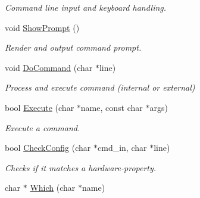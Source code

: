 \begin{DoxyCompactItemize}
\begin{DoxyCompactList}\small\item\em Command line input and keyboard handling. \end{DoxyCompactList}\item 
\hypertarget{classDOS__Shell_af64acad6a303bf9e0343dc5affb0642b}{void \hyperlink{classDOS__Shell_af64acad6a303bf9e0343dc5affb0642b}{Show\-Prompt} ()}\label{classDOS__Shell_af64acad6a303bf9e0343dc5affb0642b}

\begin{DoxyCompactList}\small\item\em Render and output command prompt. \end{DoxyCompactList}\item 
\hypertarget{classDOS__Shell_a94bcfea718765364156090361715a6ce}{void \hyperlink{classDOS__Shell_a94bcfea718765364156090361715a6ce}{Do\-Command} (char $\ast$line)}\label{classDOS__Shell_a94bcfea718765364156090361715a6ce}

\begin{DoxyCompactList}\small\item\em Process and execute command (internal or external) \end{DoxyCompactList}\item 
\hypertarget{classDOS__Shell_a1399431af1c078b66e5140240d1813d1}{bool \hyperlink{classDOS__Shell_a1399431af1c078b66e5140240d1813d1}{Execute} (char $\ast$name, const char $\ast$args)}\label{classDOS__Shell_a1399431af1c078b66e5140240d1813d1}

\begin{DoxyCompactList}\small\item\em Execute a command. \end{DoxyCompactList}\item 
\hypertarget{classDOS__Shell_a76295a24e50b9f37bff152be05c8ea93}{bool \hyperlink{classDOS__Shell_a76295a24e50b9f37bff152be05c8ea93}{Check\-Config} (char $\ast$cmd\-\_\-in, char $\ast$line)}\label{classDOS__Shell_a76295a24e50b9f37bff152be05c8ea93}

\begin{DoxyCompactList}\small\item\em Checks if it matches a hardware-\/property. \end{DoxyCompactList}\item 
\hypertarget{classDOS__Shell_af11150e3f79f620378398abad5117222}{char $\ast$ \hyperlink{classDOS__Shell_af11150e3f79f620378398abad5117222}{Which} (char $\ast$name)}\label{classDOS__Shell_af11150e3f79f620378398abad5117222}


\end{DoxyCompactItemize}
